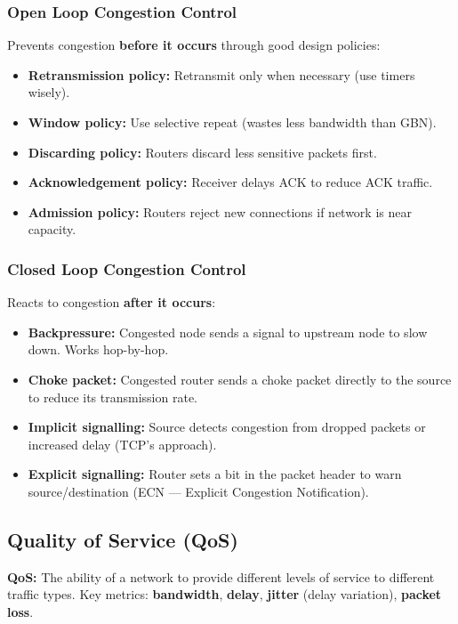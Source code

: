 \documentclass[12pt,a4paper]{article}
\begin{document}
\subsubsection*{Open Loop Congestion Control}
Prevents congestion \textbf{before it occurs} through good design policies:
\begin{itemize}[leftmargin=*, itemsep=3pt]
  \item \textbf{Retransmission policy:} Retransmit only when necessary (use timers wisely).
  \item \textbf{Window policy:} Use selective repeat (wastes less bandwidth than GBN).
  \item \textbf{Discarding policy:} Routers discard less sensitive packets first.
  \item \textbf{Acknowledgement policy:} Receiver delays ACK to reduce ACK traffic.
  \item \textbf{Admission policy:} Routers reject new connections if network is near capacity.
\end{itemize}

\subsubsection*{Closed Loop Congestion Control}
Reacts to congestion \textbf{after it occurs}:
\begin{itemize}[leftmargin=*, itemsep=3pt]
  \item \textbf{Backpressure:} Congested node sends a signal to upstream node to slow down. Works hop-by-hop.
  \item \textbf{Choke packet:} Congested router sends a choke packet directly to the source to reduce its transmission rate.
  \item \textbf{Implicit signalling:} Source detects congestion from dropped packets or increased delay (TCP's approach).
  \item \textbf{Explicit signalling:} Router sets a bit in the packet header to warn source/destination (ECN --- Explicit Congestion Notification).
\end{itemize}

\subsection{Quality of Service (QoS)}

\begin{tcolorbox}[defbox]
\textbf{QoS:} The ability of a network to provide different levels of service to different traffic types. Key metrics: \textbf{bandwidth}, \textbf{delay}, \textbf{jitter} (delay variation), \textbf{packet loss}.
\end{tcolorbox}
\end{document}
